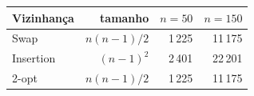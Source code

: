 \begin{tabular}{lrrr}
\toprule
Vizinhança & tamanho & $n=50$ & $n=150$ \\
\midrule
Swap & $n(n-1)/2$ & 1\,225 & 11\,175 \\
Insertion & $(n-1)^2$ & 2\,401 & 22\,201 \\
2-opt & $n(n-1)/2$ & 1\,225 & 11\,175 \\
\bottomrule
\end{tabular}
